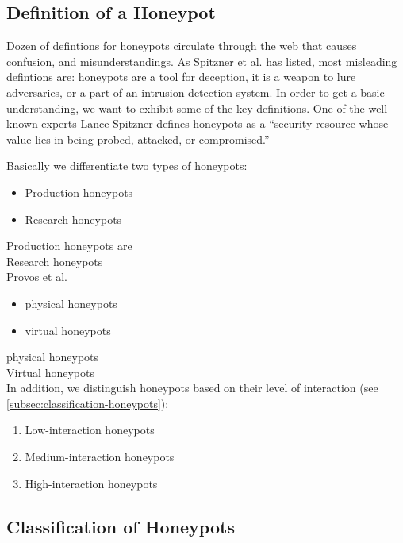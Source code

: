 \subsection{Definition of a Honeypot}

Dozen of defintions for honeypots circulate through the web that causes confusion, and misunderstandings. As Spitzner et al. \cite{Spitzner2003} has listed, most misleading defintions are: honeypots are a tool for deception, it is a weapon to lure adversaries, or a part of an intrusion detection system. In order to get a basic understanding, we want to exhibit some of the key definitions. One of the well-known experts Lance Spitzner defines honeypots as a \enquote{security resource whose value lies in being probed, attacked, or compromised.}\cite{Spitzner2003} 

Basically we differentiate two types of honeypots:

\begin{itemize}
    \item Production honeypots
    \item Research honeypots
\end{itemize}

Production honeypots are \\

Research honeypots \\

Provos et al. \cite{Provos2003} 

\begin{itemize}
    \item physical honeypots
    \item virtual honeypots
\end{itemize}

physical honeypots \\

Virtual honeypots \\

In addition, we distinguish honeypots based on their level of interaction (see \autoref{subsec:classification-honeypots}):

\begin{enumerate}
    \item Low-interaction honeypots
    \item Medium-interaction honeypots
    \item High-interaction honeypots
\end{enumerate}

\subsection{Classification of Honeypots}
\label{subsec:classification-honeypots}

